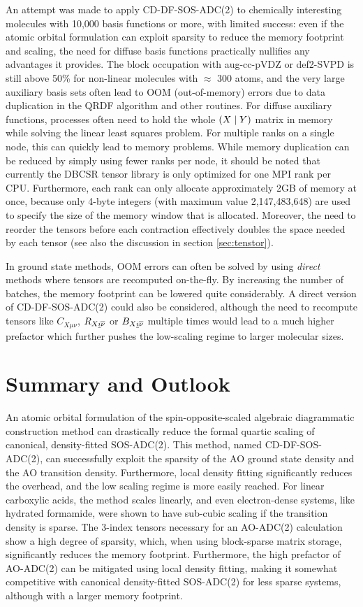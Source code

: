An attempt was made to apply CD-DF-SOS-ADC(2) to chemically interesting molecules with 10,000 basis functions or more, with limited success: even if the atomic orbital formulation can exploit sparsity to reduce the memory footprint and scaling, the need for diffuse basis functions  practically nullifies any advantages it provides. The block occupation with aug-cc-pVDZ or def2-SVPD is still above 50\% for non-linear molecules with $\approx$ 300 atoms, and the very large auxiliary basis sets often lead to OOM (out-of-memory) errors due to data duplication in the QRDF algorithm and other routines. For diffuse auxiliary functions, processes often need to hold the whole $\left( X \mid Y \right)$ matrix in memory while solving the linear least squares problem. For multiple ranks on a single node, this can quickly lead to memory problems. While memory duplication can be reduced by simply using fewer ranks per node, it should be noted that currently the DBCSR tensor library is only optimized for one MPI rank per CPU. Furthermore, each rank can only allocate approximately 2GB of memory at once, because only 4-byte integers (with maximum value 2,147,483,648) are used to specify the size of the memory window that is allocated. Moreover, the need to reorder the tensors before each contraction effectively doubles the space needed by each tensor (see also the discussion in section \ref{sec:tenstor}).

In ground state methods, OOM errors can often be solved by using \emph{direct} methods where tensors are recomputed on-the-fly. By increasing the number of batches, the memory footprint can be lowered quite considerably. A direct version of CD-DF-SOS-ADC(2) could also be considered, although the need to recompute tensors like $C_{X\mu\nu}$, $R_{X\underline{i}\overline{\nu}}$ or $B_{X\underline{i}\overline{\nu}}$ multiple times would lead to a much higher prefactor which further pushes the low-scaling regime to larger molecular sizes.

\section{Summary and Outlook}

An atomic orbital formulation of the spin-opposite-scaled algebraic diagrammatic construction method can drastically reduce the formal quartic scaling of canonical, density-fitted SOS-ADC(2). This method, named CD-DF-SOS-ADC(2), can successfully exploit the sparsity of the AO ground state density and the AO transition density. Furthermore, local density fitting significantly reduces the overhead, and the low scaling regime is more easily reached. For linear carboxylic acids, the method scales linearly, and even electron-dense systems, like hydrated formamide, were shown to have sub-cubic scaling if the transition density is sparse. The 3-index tensors necessary for an AO-ADC(2) calculation show a high degree of sparsity, which, when using block-sparse matrix storage, significantly reduces the memory footprint. Furthermore, the high prefactor of AO-ADC(2) can be mitigated using local density fitting, making it somewhat competitive with canonical density-fitted SOS-ADC(2) for less sparse systems, although with a larger memory footprint.

